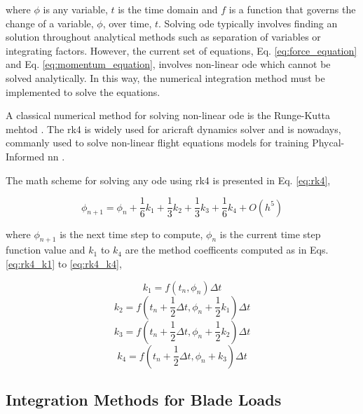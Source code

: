 \noindent where $\phi$ is any variable, $t$ is the time domain and $f$ is a function that governs the change of a variable, $\phi$, over time, $t$. Solving \gls{ode} typically involves finding an solution throughout analytical methods such as separation of variables or integrating factors. However, the current set of equations, Eq. \ref{eq:force_equation} and Eq. \ref{eq:momentum_equation}, involves non-linear \gls{ode} which cannot be solved analytically. In this way, the numerical integration method must be implemented to solve the equations.

A classical numerical method for solving non-linear \gls{ode} is the Runge-Kutta mehtod \cite{arnold_numerical_2011}. The \gls{rk4} is widely used for aricraft dynamics solver \cite{ozdemir_linear_2008,milne_high-fidelity_2023,yoo_dynamics_2024} and is nowadays, commanly used to solve non-linear flight equations models for training Phycal-Informed \gls{nn} \cite{yu_aircraft_2019}.

The math scheme for solving any \gls{ode} using \gls{rk4} is presented in Eq. \ref{eq:rk4},

\begin{equation}
    \phi_{n+1} = \phi_{n} + \frac{1}{6} k_1 + \frac{1}{3} k_2 + \frac{1}{3} k_3 + \frac{1}{6} k_4 + O(h^5)
    \label{eq:rk4}
\end{equation}

\noindent where $\phi_{n+1}$ is the next time step to compute, $\phi_{n}$ is the current time step function value and $k_1$ to $k_4$ are the method coefficents computed as in Eqs. \ref{eq:rk4_k1} to \ref{eq:rk4_k4},

\begin{equation}
    k_1 = f\left(t_n, \phi_n\right) \Delta t
    \label{eq:rk4_k1}
\end{equation}
\begin{equation}
    k_2 = f\left(t_n + \frac{1}{2}\Delta t, \phi_n + \frac{1}{2} k_1\right) \Delta t
\end{equation}
\begin{equation}
    k_3 = f\left(t_n + \frac{1}{2}\Delta t, \phi_n + \frac{1}{2} k_2\right) \Delta t
\end{equation}
\begin{equation}
    k_4 = f\left(t_n + \frac{1}{2}\Delta t, \phi_n + k_3\right) \Delta t
    \label{eq:rk4_k4}
\end{equation}

\subsection{Integration Methods for Blade Loads}
\label{sec:blade_integration}

